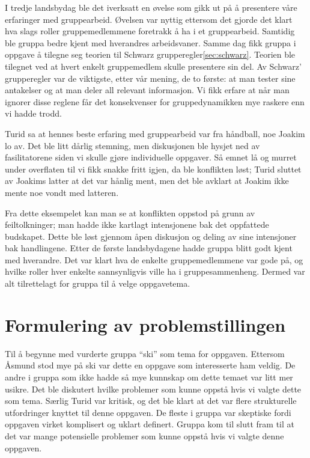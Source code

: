 I tredje landsbydag ble det iverksatt en øvelse som gikk ut på å presentere våre
erfaringer med gruppearbeid. Øvelsen var nyttig ettersom det gjorde det klart
hva slags roller gruppemedlemmene foretrakk å ha i et gruppearbeid. Samtidig ble
gruppa bedre kjent med hverandres arbeidsvaner. Samme dag fikk gruppa i oppgave
å tilegne seg teorien til Schwarz grupperegler\cref{sec:schwarz}. Teorien ble
tilegnet ved at hvert enkelt gruppemedlem skulle presentere sin del. Av
Schwarz’ grupperegler var de viktigste, etter vår mening, de to første: at
man tester sine antakelser og at man deler all relevant informasjon.  Vi fikk
erfare at når man ignorer disse reglene får det konsekvenser for
gruppedynamikken mye raskere enn vi hadde trodd.

Turid sa at hennes beste erfaring med gruppearbeid var fra håndball, noe Joakim
lo av. Det ble litt dårlig stemning, men diskusjonen ble hysjet ned av
fasilitatorene siden vi skulle gjøre individuelle oppgaver. Så emnet lå og
murret under overflaten til vi fikk snakke fritt igjen, da ble konflikten løst;
Turid sluttet av Joakims latter at det var hånlig ment, men det ble avklart at
Joakim ikke mente noe vondt med latteren.

Fra dette eksempelet kan man se at konflikten oppstod på grunn av
feiltolkninger; man hadde ikke kartlagt intensjonene bak det oppfattede
budskapet. Dette ble løst gjennom åpen diskusjon og deling av sine intensjoner
bak handlingene.  Etter de første landsbydagene hadde gruppa blitt godt kjent
med hverandre. Det var klart hva de enkelte gruppemedlemmene var gode på, og
hvilke roller hver enkelte sannsynligvis ville ha i gruppesammenheng. Dermed var
alt tilrettelagt for gruppa til å velge oppgavetema.

\section{Formulering av problemstillingen}
Til å begynne med vurderte gruppa ``ski'' som tema for oppgaven. Ettersom Åsmund
stod mye på ski var dette en oppgave som interesserte ham veldig. De andre i
gruppa som ikke hadde så mye kunnskap om dette temaet var litt mer usikre. Det
ble diskutert hvilke problemer som kunne oppstå hvis vi valgte dette
som tema. Særlig Turid var kritisk, og det ble klart at det var flere
strukturelle utfordringer knyttet til denne oppgaven. De fleste i gruppa var
skeptiske fordi oppgaven virket komplisert og uklart definert. Gruppa kom til
slutt fram til at det var mange potensielle problemer som kunne oppstå hvis vi
valgte denne oppgaven.

